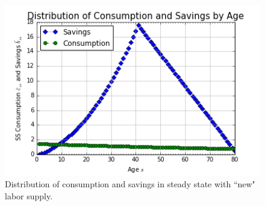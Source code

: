 \documentclass[letterpaper,12pt]{article}
\theoremstyle{definition}
\begin{document}
	\begin{figure}[h!]
	\centering
	\includegraphics[scale=.8]{code/images/cons_savings_dist2}
	\caption{Distribution of consumption and savings in steady state with ``new" labor supply.}
	\end{figure}
\end{document}
